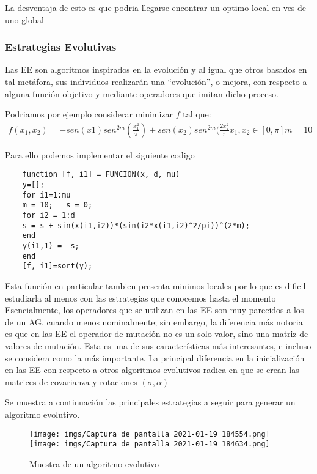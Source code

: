 \documentclass{article}
\begin{document}
La desventaja de esto es que podria llegarse encontrar un optimo local en ves de uno global

\subsubsection{Estrategias Evolutivas}

Las EE son algoritmos inspirados en la evolución y al igual que otros basados en tal metáfora, sus individuos realizarán una “evolución”, o mejora, con respecto a alguna función objetivo y mediante operadores que imitan dicho proceso.

Podriamos por ejemplo considerar minimizar $f$ tal que:
\begin{align*}
   f(x_1,x_2)=-sen(x1)sen^{2m}(\frac{x_1^2}{\pi})+sen(x_2)sen^{2m}(\frac{2x_2^2}{\pi}
   x_1,x_2 \in [0,\pi]
   m=10
\end{align*}

Para ello podemos implementar el siguiente codigo

\begin{verbatim}
    function [f, i1] = FUNCION(x, d, mu) 
    y=[];
    for i1=1:mu   
    m = 10;   s = 0;   
    for i2 = 1:d       
    s = s + sin(x(i1,i2))*(sin(i2*x(i1,i2)^2/pi))^(2*m);   
    end   
    y(i1,1) = -s; 
    end
    [f, i1]=sort(y);
\end{verbatim}
Esta función en particular tambien presenta minimos locales por lo que es dificil estudiarla al menos con las estrategias que conocemos hasta el momento
Esencialmente, los operadores que se utilizan en las EE son muy parecidos a los de un AG, cuando menos nominalmente; sin embargo, la diferencia más notoria es que en las EE el operador de mutación no es un solo valor, sino una matriz de valores de mutación. Esta es una de sus características más interesantes, e incluso se considera como la más importante.
La principal diferencia en la inicialización en las EE con respecto a otros algoritmos evolutivos radica en que se crean las matrices de covarianza y rotaciones $(\sigma,\alpha)$

Se muestra a continuación las principales estrategias a seguir para generar un algoritmo evolutivo.
\begin{figure}[h!]
    \centering
    \texttt{[image: imgs/Captura de pantalla 2021-01-19 184554.png]}
    \texttt{[image: imgs/Captura de pantalla 2021-01-19 184634.png]}
    \caption{Muestra de un algoritmo evolutivo}
    \label{fig:my_label}
\end{figure}
\end{document}
